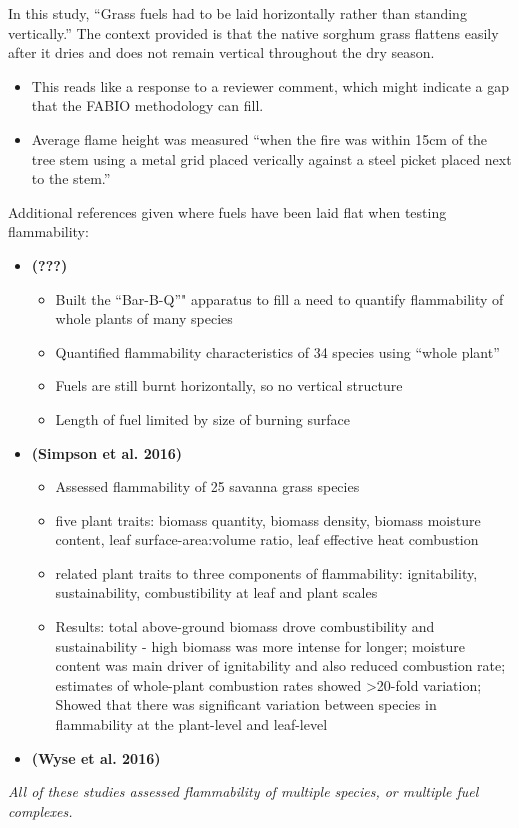 \documentclass[11pt,a4paper]{article}
\begin{document}
In this study, ``Grass fuels had to be laid horizontally rather than
standing vertically.'' The context provided is that the native sorghum
grass flattens easily after it dries and does not remain vertical
throughout the dry season.

\begin{itemize}
\item
  This reads like a response to a reviewer comment, which might indicate
  a gap that the FABIO methodology can fill.
\item
  Average flame height was measured ``when the fire was within 15cm of
  the tree stem using a metal grid placed verically against a steel
  picket placed next to the stem.''
\end{itemize}

Additional references given where fuels have been laid flat when testing
flammability:

\begin{itemize}
\item
  \textbf{({\textbf{???}})}

  \begin{itemize}
  \item
    Built the ``Bar-B-Q''" apparatus to fill a need to quantify
    flammability of whole plants of many species
  \item
    Quantified flammability characteristics of 34 species using ``whole
    plant''
  \item
    Fuels are still burnt horizontally, so no vertical structure
  \item
    Length of fuel limited by size of burning surface
  \end{itemize}
\item
  \textbf{(Simpson et al. 2016)}

  \begin{itemize}
  \item
    Assessed flammability of 25 savanna grass species
  \item
    five plant traits: biomass quantity, biomass density, biomass
    moisture content, leaf surface-area:volume ratio, leaf effective
    heat combustion
  \item
    related plant traits to three components of flammability:
    ignitability, sustainability, combustibility at leaf and plant
    scales
  \item
    Results: total above-ground biomass drove combustibility and
    sustainability - high biomass was more intense for longer; moisture
    content was main driver of ignitability and also reduced combustion
    rate; estimates of whole-plant combustion rates showed
    \textgreater{}20-fold variation; Showed that there was significant
    variation between species in flammability at the plant-level and
    leaf-level
  \end{itemize}
\item
  \textbf{(Wyse et al. 2016)}
\end{itemize}

\emph{All of these studies assessed flammability of multiple species, or
multiple fuel complexes.}
\end{document}
